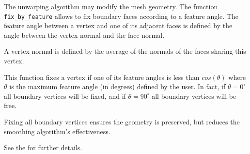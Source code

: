 \hypertarget{fixbyfeature}{}

The unwarping algorithm may modify the mesh geometry. The function
\texttt{fix\_by\_feature} allows to fix boundary faces according to a feature angle.
The feature angle between a vertex and one of its adjacent faces is defined
by the angle between the vertex normal and the face normal.

A vertex normal is defined by the average of the normals of the
faces sharing this vertex.

This function fixes a vertex if one of its feature angles is less than
$cos(\theta)$ where $\theta$ is the maximum feature angle (in degrees)
defined by the user.
In fact, if $\theta = 0^{\circ}$ all boundary vertices will be fixed, and
if $\theta = 90^{\circ}$ all boundary vertices will be free.

Fixing all boundary vertices ensures the geometry is preserved, but reduces
the smoothing algorithm's effectiveness.

See the  for further details.
